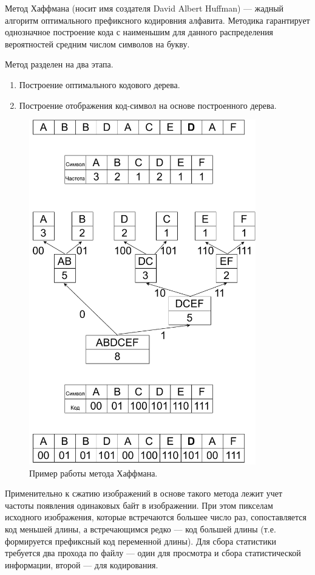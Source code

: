     Метод Хаффмана (носит имя создателя David Albert Huffman) --- жадный алгоритм оптимального префиксного кодировния алфавита. Методика гарантирует однозначное построение кода с наименьшим для данного распределения вероятностей средним числом символов на букву.\cite{haff}
    
    Метод разделен на два этапа.
    \begin{enumerate}
    	\item Построение оптимального кодового дерева.
    	\item Построение отображения код-символ на основе построенного дерева.
    \end{enumerate}

	 \begin{figure}[h!]
		\centering
		\includegraphics[width=\textwidth,height=15cm,keepaspectratio]{haff01.pdf}
		\caption{Пример работы метода Хаффмана.} \label{fig:haff01}
	\end{figure}
	
\newpage
	Применительно к сжатию изображений в основе такого метода лежит учет частоты появления одинаковых байт в изображении. При этом пикселам
исходного изображения, которые встречаются большее число раз,
сопоставляется код меньшей длины, а встречающимся редко --- код большей
длины (т.е. формируется префиксный код переменной длины). Для сбора
статистики требуется два прохода по файлу --- один для просмотра и сбора
статистической информации, второй ---  для кодирования. \cite{haff2}

